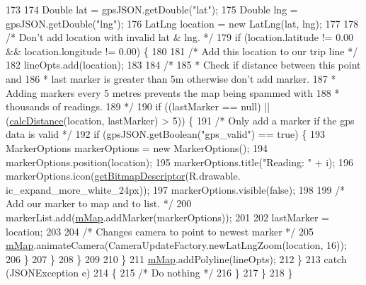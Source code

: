 \begin{DoxyCode}
173 
174                     Double lat = gpsJSON.getDouble(\textcolor{stringliteral}{"lat"});
175                     Double lng = gpsJSON.getDouble(\textcolor{stringliteral}{"lng"});
176                     LatLng location = \textcolor{keyword}{new} LatLng(lat, lng);
177 
178                     \textcolor{comment}{/* Don't add location with invalid lat & lng. */}
179                     \textcolor{keywordflow}{if} (location.latitude != 0.00 && location.longitude != 0.00) \{
180 
181                         \textcolor{comment}{/* Add this location to our trip line */}
182                         lineOpts.add(location);
183 
184                         \textcolor{comment}{/*}
185 \textcolor{comment}{                         * Check if distance between this point and}
186 \textcolor{comment}{                         * last marker is greater than 5m otherwise don't add marker.}
187 \textcolor{comment}{                         * Adding markers every 5 metres prevents the map being spammed with}
188 \textcolor{comment}{                         * thousands of readings.}
189 \textcolor{comment}{                         */}
190                         \textcolor{keywordflow}{if} ((lastMarker == null) || (\hyperlink{class_android_app_1_1_maps_activity_aea9b9fe75f1d70e3c902c8348823efd0}{calcDistance}(location, lastMarker) > 5)) \{
191                             \textcolor{comment}{/* Only add a marker if the gps data is valid */}
192                             \textcolor{keywordflow}{if} (gpsJSON.getBoolean(\textcolor{stringliteral}{"gps\_valid"}) == \textcolor{keyword}{true}) \{
193                                 MarkerOptions markerOptions = \textcolor{keyword}{new} MarkerOptions();
194                                 markerOptions.position(location);
195                                 markerOptions.title(\textcolor{stringliteral}{"Reading: "} + i);
196                                 markerOptions.icon(\hyperlink{class_android_app_1_1_maps_activity_a77f66c756f18d56bd41f0ee1c889fb62}{getBitmapDescriptor}(R.drawable.
      ic\_expand\_more\_white\_24px));
197                                 markerOptions.visible(\textcolor{keyword}{false});
198 
199                                 \textcolor{comment}{/* Add our marker to map and to list. */}
200                                 markerList.add(\hyperlink{class_android_app_1_1_maps_activity_a373d4c770d2ab34538f9288d7c0e83ea}{mMap}.addMarker(markerOptions));
201 
202                                 lastMarker = location;
203 
204                                 \textcolor{comment}{/* Changes camera to point to newest marker */}
205                                 \hyperlink{class_android_app_1_1_maps_activity_a373d4c770d2ab34538f9288d7c0e83ea}{mMap}.animateCamera(CameraUpdateFactory.newLatLngZoom(location, 16));
206                             \}
207                         \}
208                     \}
209 
210                 \}
211                 \hyperlink{class_android_app_1_1_maps_activity_a373d4c770d2ab34538f9288d7c0e83ea}{mMap}.addPolyline(lineOpts);
212             \}
213             \textcolor{keywordflow}{catch} (JSONException e)
214             \{
215                 \textcolor{comment}{/* Do nothing */}
216             \}
217         \}
218     \}
\end{DoxyCode}
